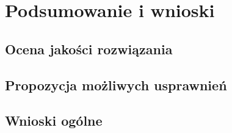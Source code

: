 \chapter{Podsumowanie i wnioski}
\label{cha:wnioski}

\section{Ocena jakości rozwiązania}

\section{Propozycja możliwych usprawnień}

\section{Wnioski ogólne}